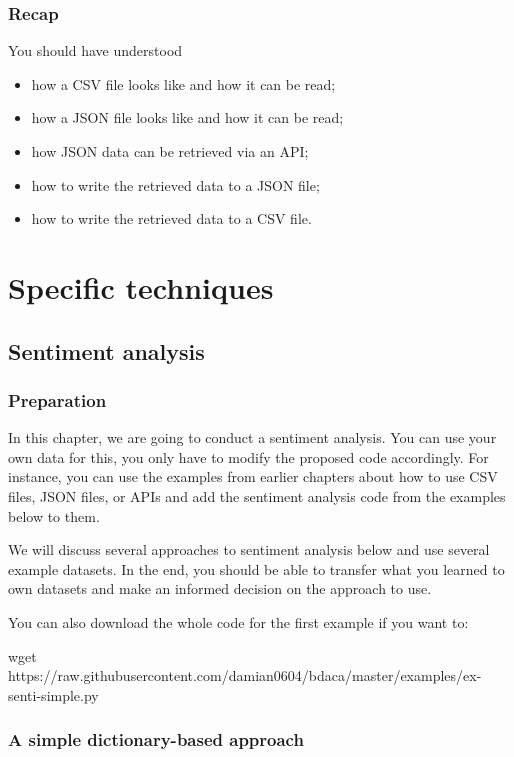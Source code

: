 \documentclass[a4paper,12pt]{book}
\begin{document}
\section{Recap}
You should have understood 
\begin{itemize}
\item how a CSV file looks like and how it can be read;
\item how a JSON file looks like and how it can be read;
\item how JSON data can be retrieved via an API;
\item how to write the retrieved data to a JSON file;
\item how to write the retrieved data to a CSV file.
\end{itemize}


\part{Specific techniques}
\label{part:specific}

\chapter{Sentiment analysis}
\section{Preparation}
In this chapter, we are going to conduct a sentiment analysis. You can use your own data for this, you only have to modify the proposed code accordingly. For instance, you can use the examples from earlier chapters about how to use CSV files, JSON files, or APIs and add the sentiment analysis code from the examples below to them.

We will discuss several approaches to sentiment analysis below and use several example datasets. In the end, you should be able to transfer what you learned to own datasets and make an informed decision on the approach to use.


You can also download the whole code for the first example if you want to:

\begin{lstlistingbash}
wget https://raw.githubusercontent.com/damian0604/bdaca/master/examples/ex-senti-simple.py
\end{lstlistingbash}


\section{A simple dictionary-based approach}
\label{simplesent}
\end{document}
